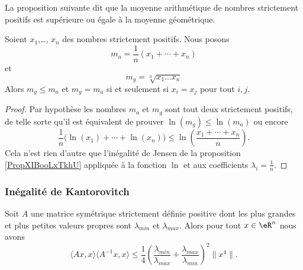 La proposition suivante dit que la moyenne arithmétique de nombres strictement positifs est supérieure ou égale à la moyenne géométrique.
\begin{proposition}    \label{PropWDPooBtHIAR}
    Soient \( x_1\),\ldots, \( x_n\) des nombres strictement positifs. Nous posons
    \begin{equation}
        m_a=\frac{1}{ n }(x_1+\cdots +x_n)
    \end{equation}
    et
    \begin{equation}
        m_g=\sqrt[n]{x_1\ldots x_n}
    \end{equation}
    Alors \( m_g\leq m_a\) et \( m_g=m_a\) si et seulement si \( x_i=x_j\) pour tout \( i,j\).
\end{proposition}

\begin{proof}
    Par hypothèse les nombres \( m_a\) et \( m_g\) sont tout deux strictement positifs, de telle sorte qu'il est équivalent de prouver \( \ln(m_g)\leq \ln(m_a)\) ou encore
    \begin{equation}
        \frac{1}{ n }\big( \ln(x_1)+\cdots +\ln(x_n) \big)\leq \ln\left( \frac{ x_1+\cdots +x_n }{ n } \right).
    \end{equation}
    Cela n'est rien d'autre que l'inégalité de Jensen de la proposition \ref{PropXIBooLxTkhU} appliquée à la fonction \( \ln\) et aux coefficients \( \lambda_i=\frac{1}{ n }\).
\end{proof}

\subsubsection{Inégalité de Kantorovitch}

\begin{proposition}    \label{PropMNUooFbYkug}
    Soit \( A\) une matrice symétrique strictement définie positive dont les plus grandes et plus petites valeurs propres sont \( \lambda_{min}\) et \( \lambda_{max}\). Alors pour tout \( x\in \eR^n\) nous avons
    \begin{equation}
        \langle Ax, x\rangle \langle A^{-1}x, x\rangle \leq \frac{1}{ 4 }\left( \frac{ \lambda_{min} }{ \lambda_{max} }+\frac{ \lambda_{max} }{ \lambda_{min} } \right)^2\| x^4 \|.
    \end{equation}
\end{proposition}

